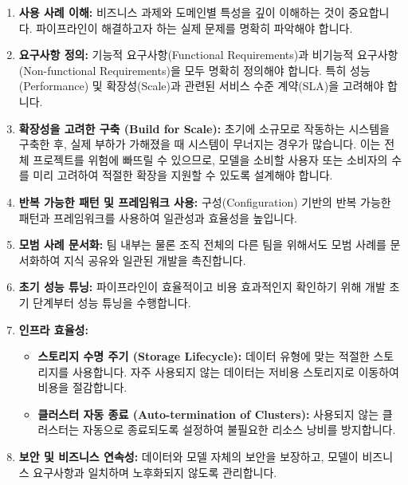\documentclass[11pt,a4paper]{article}
\theoremstyle{definition}
\begin{document}
\begin{enumerate}
    \item \textbf{사용 사례 이해:}
    비즈니스 과제와 도메인별 특성을 깊이 이해하는 것이 중요합니다. 파이프라인이 해결하고자 하는 실제 문제를 명확히 파악해야 합니다.

    \item \textbf{요구사항 정의:}
    기능적 요구사항(Functional Requirements)과 비기능적 요구사항(Non-functional Requirements)을 모두 명확히 정의해야 합니다. 특히 성능(Performance) 및 확장성(Scale)과 관련된 서비스 수준 계약(SLA)을 고려해야 합니다.

    \item \textbf{확장성을 고려한 구축 (Build for Scale):}
    초기에 소규모로 작동하는 시스템을 구축한 후, 실제 부하가 가해졌을 때 시스템이 무너지는 경우가 많습니다. 이는 전체 프로젝트를 위험에 빠뜨릴 수 있으므로, 모델을 소비할 사용자 또는 소비자의 수를 미리 고려하여 적절한 확장을 지원할 수 있도록 설계해야 합니다.

    \item \textbf{반복 가능한 패턴 및 프레임워크 사용:}
    구성(Configuration) 기반의 반복 가능한 패턴과 프레임워크를 사용하여 일관성과 효율성을 높입니다.

    \item \textbf{모범 사례 문서화:}
    팀 내부는 물론 조직 전체의 다른 팀을 위해서도 모범 사례를 문서화하여 지식 공유와 일관된 개발을 촉진합니다.

    \item \textbf{초기 성능 튜닝:}
    파이프라인이 효율적이고 비용 효과적인지 확인하기 위해 개발 초기 단계부터 성능 튜닝을 수행합니다.

    \item \textbf{인프라 효율성:}
    \begin{itemize}
        \item \textbf{스토리지 수명 주기 (Storage Lifecycle):} 데이터 유형에 맞는 적절한 스토리지를 사용합니다. 자주 사용되지 않는 데이터는 저비용 스토리지로 이동하여 비용을 절감합니다.
        \item \textbf{클러스터 자동 종료 (Auto-termination of Clusters):} 사용되지 않는 클러스터는 자동으로 종료되도록 설정하여 불필요한 리소스 낭비를 방지합니다.
    \end{itemize}

    \item \textbf{보안 및 비즈니스 연속성:}
    데이터와 모델 자체의 보안을 보장하고, 모델이 비즈니스 요구사항과 일치하며 노후화되지 않도록 관리합니다.


\end{enumerate}
\end{document}
